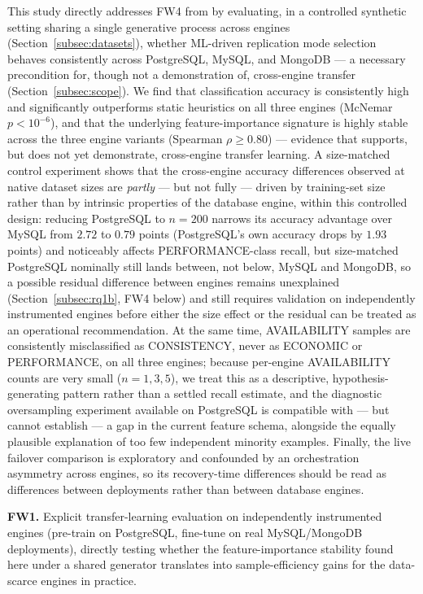 \documentclass[iicol,pdflatex,sn-mathphys-num]{sn-jnl}
\theoremstyle{thmstyleone}
\theoremstyle{thmstylethree}
\begin{document}
This study directly addresses FW4 from \cite{iaha2026} by evaluating,
in a controlled synthetic setting sharing a single generative process
across engines (Section~\ref{subsec:datasets}), whether ML-driven
replication mode selection behaves consistently across PostgreSQL,
MySQL, and MongoDB --- a necessary precondition for, though not a
demonstration of, cross-engine transfer (Section~\ref{subsec:scope}).
We find that classification accuracy is consistently high
and significantly outperforms static heuristics on all three engines
(McNemar $p<10^{-6}$), and that the underlying feature-importance
signature is highly stable across the three engine variants (Spearman
$\rho \geq 0.80$) --- evidence that supports, but does not yet
demonstrate, cross-engine transfer learning. A size-matched control
experiment shows that the cross-engine accuracy differences observed
at native dataset sizes are \emph{partly} --- but not fully --- driven
by training-set size rather than by intrinsic properties of the
database engine, within this controlled design: reducing PostgreSQL to
$n=200$ narrows its accuracy advantage over MySQL from $2.72$ to
$0.79$ points (PostgreSQL's own accuracy drops by $1.93$ points) and
noticeably affects PERFORMANCE-class recall, but size-matched
PostgreSQL nominally still lands between, not below, MySQL and MongoDB,
so a possible residual difference between engines remains unexplained
(Section~\ref{subsec:rq1b}, FW4 below) and still requires validation
on independently instrumented engines before either the size effect or
the residual can be treated as an operational recommendation. At the same time, AVAILABILITY samples are consistently
misclassified as CONSISTENCY, never as ECONOMIC or PERFORMANCE, on all
three engines; because per-engine AVAILABILITY counts are very small
($n=1,3,5$), we treat this as a descriptive, hypothesis-generating
pattern rather than a settled recall estimate, and the diagnostic
oversampling experiment available on PostgreSQL is compatible with ---
but cannot establish --- a gap in the current feature schema, alongside
the equally plausible explanation of too few independent minority
examples. Finally, the live failover comparison is exploratory and
confounded by an orchestration asymmetry across engines, so its
recovery-time differences should be read as differences between
deployments rather than between database engines.

\textbf{FW1.} Explicit transfer-learning evaluation on independently
instrumented engines (pre-train on PostgreSQL, fine-tune on real
MySQL/MongoDB deployments), directly testing whether the
feature-importance stability found here under a shared generator
translates into sample-efficiency gains for the data-scarce engines
in practice.
\end{document}
